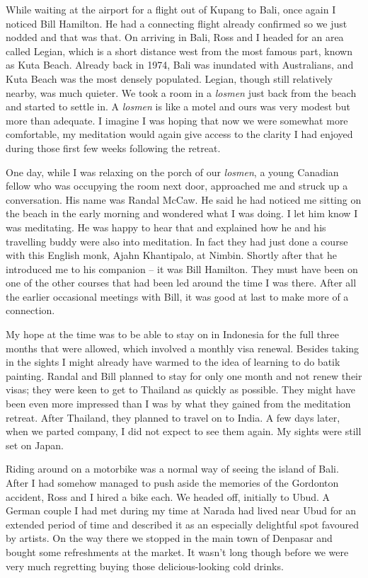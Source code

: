 While waiting at the airport for a flight out of Kupang to Bali, once
again I noticed Bill Hamilton. He had a connecting flight already
confirmed so we just nodded and that was that. On arriving in Bali, Ross
and I headed for an area called Legian, which is a short distance west
from the most famous part, known as Kuta Beach. Already back in 1974,
Bali was inundated with Australians, and Kuta Beach was the most densely
populated. Legian, though still relatively nearby, was much quieter. We
took a room in a \emph{losmen} just back from the beach and started to
settle in. A \emph{losmen} is like a motel and ours was very modest but
more than adequate. I imagine I was hoping that now we were somewhat
more comfortable, my meditation would again give access to the clarity I
had enjoyed during those first few weeks following the retreat.

One day, while I was relaxing on the porch of our \emph{losmen}, a young
Canadian fellow who was occupying the room next door, approached me and
struck up a conversation. His name was Randal McCaw. He said he had
noticed me sitting on the beach in the early morning and wondered what I
was doing. I let him know I was meditating. He was happy to hear that
and explained how he and his travelling buddy were also into meditation.
In fact they had just done a course with this English monk, Ajahn
Khantipalo, at Nimbin. Shortly after that he introduced me to his
companion -- it was Bill Hamilton. They must have been on one of the
other courses that had been led around the time I was there. After all
the earlier occasional meetings with Bill, it was good at last to make
more of a connection.

My hope at the time was to be able to stay on in Indonesia for the full
three months that were allowed, which involved a monthly visa renewal.
Besides taking in the sights I might already have warmed to the idea of
learning to do batik painting. Randal and Bill planned to stay for only
one month and not renew their visas; they were keen to get to Thailand
as quickly as possible. They might have been even more impressed than I
was by what they gained from the meditation retreat. After Thailand,
they planned to travel on to India. A few days later, when we parted
company, I did not expect to see them again. My sights were still set on
Japan.

Riding around on a motorbike was a normal way of seeing the island of
Bali. After I had somehow managed to push aside the memories of the
Gordonton accident, Ross and I hired a bike each. We headed off,
initially to Ubud. A German couple I had met during my time at Narada
had lived near Ubud for an extended period of time and described it as
an especially delightful spot favoured by artists. On the way there we
stopped in the main town of Denpasar and bought some refreshments at the
market. It wasn't long though before we were very much regretting buying
those delicious-looking cold drinks.

